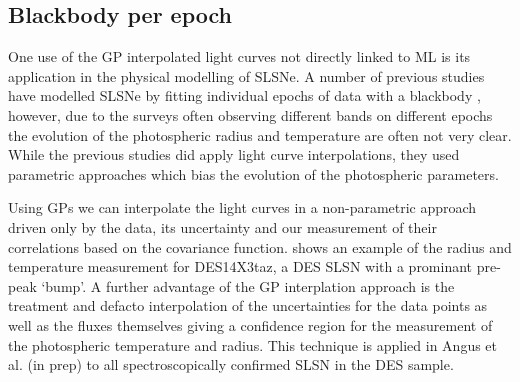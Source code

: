 \subsection{Blackbody per epoch}
One use of the GP interpolated light curves not directly linked to ML is its application in the physical modelling of SLSNe. A number of previous studies have modelled SLSNe by fitting individual epochs of data with a blackbody \citep{Howell2013,Papadopuplus2014,Smith2016,Nicholl2017}, however, due to the surveys often observing different bands on different epochs the evolution of the photospheric radius and temperature are often not very clear. While the previous studies did apply light curve interpolations, they used parametric approaches which bias the evolution of the photospheric parameters.

Using GPs we can interpolate the light curves in a non-parametric approach driven only by the data, its uncertainty and our measurement of their correlations based on the covariance function.  shows an example of the radius and temperature measurement for DES14X3taz, a DES SLSN with a prominant pre-peak `bump'. A further advantage of the GP interplation approach is the treatment and defacto interpolation of the uncertainties for the data points as well as the fluxes themselves giving a confidence region for the measurement of the photospheric temperature and radius. This technique is applied in Angus et al. (in prep) to all spectroscopically confirmed SLSN in the DES sample.

\begin{figure}
  \caption{}
  \label{fig:GPBB}
\end{figure}
